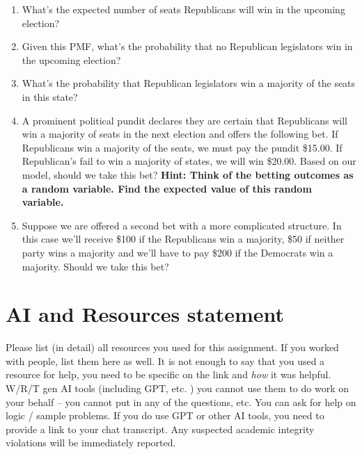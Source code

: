 \documentclass[
]{article}
\begin{document}
\begin{enumerate}
\def\labelenumi{\alph{enumi}.}
\item
  What's the expected number of seats Republicans will win in the
  upcoming election?
\item
  Given this PMF, what's the probability that no Republican legislators
  win in the upcoming election?

  \hfill\break
  \hfill\break
  \hfill\break
  \hfill\break
  \hfill\break
  \hfill\break
  \hfill\break
  \hfill\break
  \hfill\break
  \hfill\break
\item
  What's the probability that Republican legislators win a majority of
  the seats in this state?

  \hfill\break
  \hfill\break
  \hfill\break
  \hfill\break
  \hfill\break
  \hfill\break
  \hfill\break
\item
  A prominent political pundit declares they are certain that
  Republicans will win a majority of seats in the next election and
  offers the following bet. If Republicans win a majority of the seats,
  we must pay the pundit \$15.00. If Republican's fail to win a majority
  of states, we will win \$20.00. Based on our model, should we take
  this bet? \textbf{Hint: Think of the betting outcomes as a random
  variable. Find the expected value of this random variable.}

  \hfill\break
  \hfill\break
  \hfill\break
  \hfill\break
  \hfill\break
  \hfill\break
  \hfill\break
  \hfill\break
  \hfill\break
  \hfill\break
\item
  Suppose we are offered a second bet with a more complicated structure.
  In this case we'll receive \$100 if the Republicans win a majority,
  \$50 if neither party wins a majority and we'll have to pay \$200 if
  the Democrats win a majority. Should we take this bet?
\end{enumerate}

\section{AI and Resources statement}\label{ai-and-resources-statement}

Please list (in detail) all resources you used for this assignment. If
you worked with people, list them here as well. It is not enough to say
that you used a resource for help, you need to be specific on the link
and \emph{how} it was helpful. W/R/T gen AI tools (including GPT, etc. )
you cannot use them to do work on your behalf -- you cannot put in any
of the questions, etc. You can ask for help on logic / sample problems.
If you do use GPT or other AI tools, you need to provide a link to your
chat transcript. Any suspected academic integrity violations will be
immediately reported.
\end{document}
